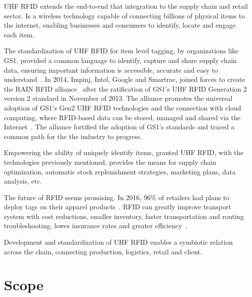 \gls{UHF RFID} extends the end-to-end that integration to the \gls{supply chain} and retail sector. Is a wireless technology capable of connecting billions of physical items to the internet, enabling businesses and consumers to identify, locate and engage each item.

The standardization of \gls{UHF RFID} for item level tagging, by organizations like \gls{GS1}, provided a common language to identify, capture and share supply chain data, ensuring important information is accessible, accurate and easy to understand~\cite{anonymousStandardsGS12014}.
In 2014, Impinj, Intel, Google and Smartrac, joined forces to create the \gls{RAIN RFID} alliance~\cite{TechnologyCompaniesCreate} after the ratification of \gls{GS1}'s \gls{UHF RFID} Generation 2 version 2 standard in November of 2013. The alliance promotes the universal adoption of \gls{GS1}'s Gen2 \gls{UHF RFID} technologies and the connection with \gls{cloud computing}, where RFID-based data can be stored, managed and shared via the Internet~\cite{WhatRAINRFID}.
The alliance fortified the adoption of \gls{GS1}'s standards and traced a common path for the the industry to progress.

Empowering the ability of uniquely identify items, granted \gls{UHF RFID}, with the technologies previously mentioned, provides the means for \gls{supply chain} optimization, automatic stock replenishment strategies, marketing plans, data analysis, etc. 

The future of \gls{RFID} seems promising. In 2016, 96\% of retailers had plans to deploy tags on their apparel products~\cite{hardgrave2016StateRFID}. \gls{RFID} can greatly improve transport system with cost reductions, smaller inventory, faster transportation and routing troubleshooting, lower insurance rates and greater efficiency~\cite{oanaRFIDTechnologyContainers2013}.

Development and standardization of \gls{UHF RFID} enables a symbiotic relation across the chain, connecting production, logistics, retail and client.

\section{Scope}




